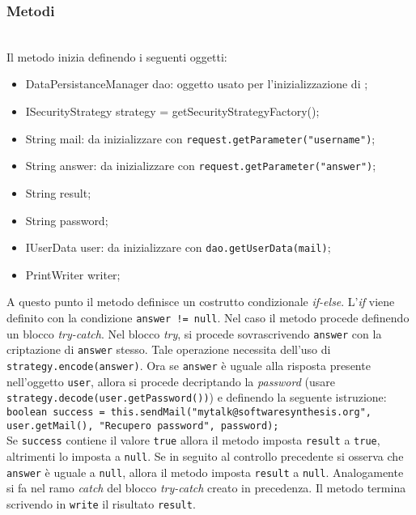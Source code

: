 \subsubsection*{Metodi}
\begin{description}
	\item{}\\

Il metodo inizia definendo i seguenti oggetti:

\begin{itemize}
	\item DataPersistanceManager dao: oggetto usato per l'inizializzazione di ;
	\item ISecurityStrategy strategy = getSecurityStrategyFactory();
	\item String mail: da inizializzare con \verb|request.getParameter("username")|;
	\item String answer: da inizializzare con \verb|request.getParameter("answer")|;
	\item String result;
	\item String password;
	\item IUserData user: da inizializzare con \verb|dao.getUserData(mail)|;
	\item PrintWriter writer;
\end{itemize}

A questo punto il metodo definisce un costrutto condizionale \textit{if-else}. L'\textit{if} viene definito con la condizione \texttt{answer != null}. Nel caso il metodo procede definendo un blocco \textit{try-catch}. Nel blocco \textit{try}, si procede sovrascrivendo \texttt{answer} con la criptazione di \texttt{answer} stesso. Tale operazione necessita dell'uso di \texttt{strategy.encode(answer)}. Ora se \texttt{answer} è uguale alla risposta presente nell'oggetto \texttt{user}, allora si procede decriptando la \textit{password} (usare \texttt{strategy.decode(user.getPassword())}) e definendo la seguente istruzione:\\

\verb|boolean success = this.sendMail("mytalk@softwaresynthesis.org",|\\
\verb|user.getMail(), "Recupero password", password);|\\

Se \texttt{success} contiene il valore \texttt{true} allora il metodo imposta \texttt{result} a \texttt{true}, altrimenti lo imposta a \texttt{null}. Se in seguito al controllo precedente si osserva che \texttt{answer} è uguale a \texttt{null}, allora il metodo imposta \texttt{result} a \texttt{null}. Analogamente si fa nel ramo \textit{catch} del blocco \textit{try-catch} creato in precedenza. Il metodo termina scrivendo in \texttt{write} il risultato \texttt{result}.


\end{description}
